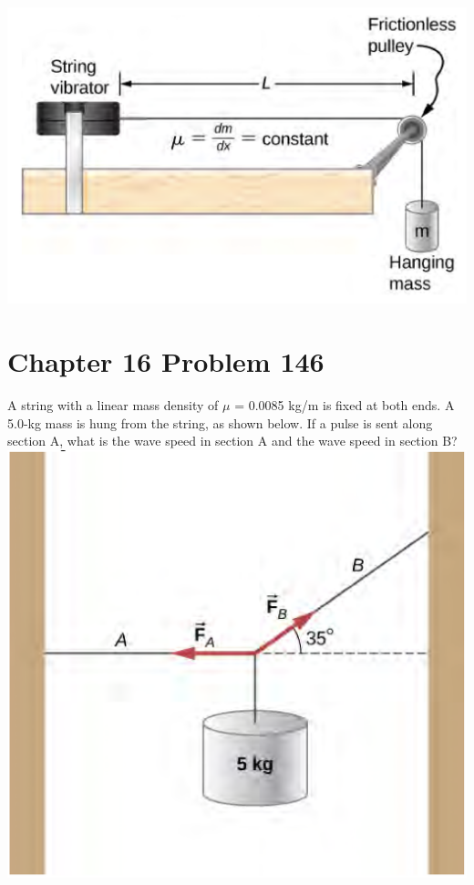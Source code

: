 \documentclass[11pt]{article}
\begin{document}
 \includegraphics[scale=0.35]{16-104.png}
 \newpage

 \section*{Chapter 16 Problem 146}
 A string with a linear mass density of \(\mu\) = 0.0085 kg/m is fixed at both ends. A 5.0-kg mass is hung from the string, as shown below. 
 If a pulse is sent along section A, what is the wave speed in section A and the wave speed in section B? \\

 \includegraphics[scale=0.35]{16-146.png}
\end{document}
